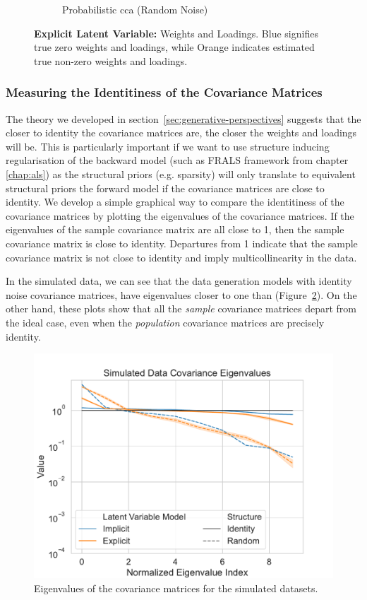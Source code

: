 \begin{figure}
\begin{subfigure}{0.49\linewidth}
        \caption{Probabilistic \acrshort{cca} (Random Noise)}
    \end{subfigure}
    \caption{\textbf{Explicit Latent Variable:} Weights and Loadings. Blue signifies true zero weights and loadings, while Orange indicates estimated true non-zero weights and loadings.}\label{fig:explicit-latent-variable-weights-loadings}
\end{figure}




\subsubsection{Measuring the Identitiness of the Covariance Matrices}
The theory we developed in section~\ref{sec:generative-perspectives} suggests that the closer to identity the covariance matrices are, the closer the weights and \gls{loadings} will be.
This is particularly important if we want to use structure inducing regularisation of the backward model (such as FRALS framework from chapter \ref{chap:als}) as the structural priors (e.g. sparsity) will only translate to equivalent structural priors the forward model if the covariance matrices are close to identity.
We develop a simple graphical way to compare the identitiness of the covariance matrices by plotting the eigenvalues of the covariance matrices.
If the eigenvalues of the sample covariance matrix are all close to 1, then the sample covariance matrix is close to identity.
Departures from 1 indicate that the sample covariance matrix is not close to identity and imply multicollinearity in the data.

In the simulated data, we can see that the data generation models with identity noise covariance matrices, have eigenvalues closer to one than (Figure~\ref{fig:covariance-eigenvalues-simulated-low}).
On the other hand, these plots show that all the \textit{sample} covariance matrices depart from the ideal case, even when the \textit{population} covariance matrices are precisely identity.

\begin{figure}
    \centering
    \includegraphics[width=0.8\linewidth]{figures/covariance/simulated_covariance_eigenvalues_low}
    \caption{Eigenvalues of the covariance matrices for the simulated datasets.}\label{fig:covariance-eigenvalues-simulated-low}
\end{figure}


